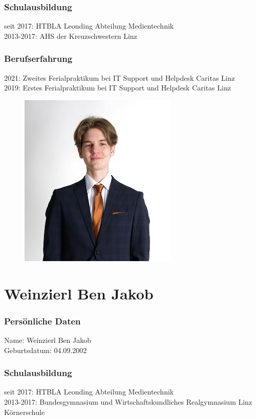 \subsubsection{Schulausbildung}
seit 2017: HTBLA Leonding Abteilung Medientechnik \\
2013-2017: AHS der Kreuzschwestern Linz
\subsubsection{Berufserfahrung}
2021: Zweites Ferialpraktikum bei IT Support und Helpdesk Caritas Linz \\
2019: Erstes Ferialpraktikum bei IT Support und Helpdesk Caritas Linz

\begin{figure}[H]
    \includegraphics[scale=0.6]{pics/rafi.png}
\end{figure}
\section{Weinzierl Ben Jakob}
\subsubsection{Persönliche Daten}
Name: Weinzierl Ben Jakob\\
Geburtsdatum: 04.09.2002
\subsubsection{Schulausbildung}
seit 2017: HTBLA Leonding Abteilung Medientechnik \\
2013-2017: Bundesgymnasium und Wirtschaftskundliches Realgymnasium Linz Körnerschule
